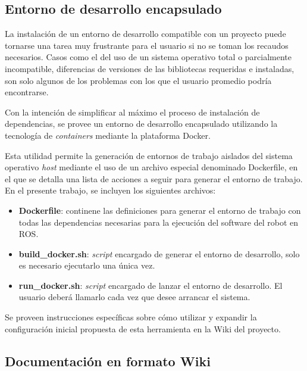 \subsection{Entorno de desarrollo encapsulado}

La instalación de un entorno de desarrollo compatible con un proyecto puede tornarse una tarea muy frustrante para el usuario si no se toman los recaudos necesarios. Casos como el del uso de un sistema operativo total o parcialmente incompatible, diferencias de versiones de las bibliotecas requeridas e instaladas, son solo algunos de los problemas con los que el usuario promedio podría encontrarse.

Con la intención de simplificar al máximo el proceso de instalación de dependencias, se provee un entorno de desarrollo encapsulado utilizando la tecnología de \textit{containers} mediante la plataforma Docker\protect\footnotemark.


Esta utilidad permite la generación de entornos de trabajo aislados del sistema operativo \textit{host} mediante el uso de un archivo especial denominado Dockerfile, en el que se detalla una lista de acciones a seguir para generar el entorno de trabajo. En el presente trabajo, se incluyen los siguientes archivos:


\begin{itemize}
  \item \textbf{Dockerfile}: continene las definiciones para generar el entorno de trabajo con todas las dependencias necesarias para la ejecución del software del robot en ROS.
  \item \textbf{build\_docker.sh}: \textit{script} encargado de generar el entorno de desarrollo, solo es necesario ejecutarlo una única vez.
  \item \textbf{run\_docker.sh}: \textit{script} encargado de lanzar el entorno de desarrollo. El usuario deberá llamarlo cada vez que desee arrancar el sistema.
\end{itemize}


Se proveen instrucciones específicas sobre cómo utilizar y expandir la configuración inicial propuesta de esta herramienta en la Wiki del proyecto.

\subsection{Documentación en formato Wiki}

